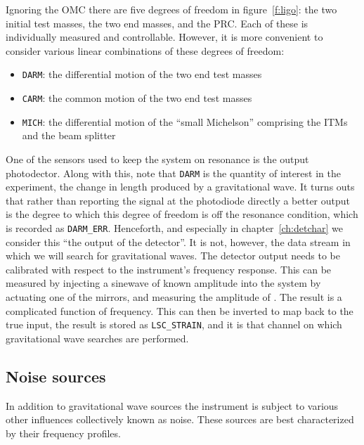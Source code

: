 Ignoring the OMC there are five degrees of freedom in
figure~\ref{f:ligo}: the two initial test masses, the two end masses,
and the PRC.  Each of these is individually measured and controllable.
However, it is more convenient to consider various linear combinations
of these degrees of freedom:

\begin{itemize}
\item \texttt{DARM}: the differential motion of the two end test masses
\item \texttt{CARM}: the common motion of the two end test masses
\item \texttt{MICH}: the differential motion of the ``small Michelson'' comprising
the ITMs and the beam splitter
\end{itemize}

One of the sensors used to keep the system on resonance is the output
photodector.  Along with this, note that \texttt{DARM} is the quantity
of interest in the experiment, the change in length produced by a
gravitational wave.    It turns outs that rather than reporting the
signal at the photodiode directly a better output is the degree to
which this degree of freedom is off the resonance condition, which is
recorded as \texttt{DARM\_ERR}.  Henceforth, and especially in
chapter~\ref{ch:detchar} we consider this ``the output of the
detector''.  It is not, however, the data stream in which we will
search for gravitational waves.  The detector output needs to be
calibrated with respect to the instrument's frequency response.  This
can be measured by injecting a sinewave of known amplitude into the
system by actuating one of the mirrors, and measuring the amplitude of
\darmerr.  The result is a complicated function of frequency.  This
can then be inverted to map \darmerr back to the true input, the
result is stored as \texttt{LSC\_STRAIN}, and it is that channel on
which gravitational wave searches are performed.

\subsection{Noise sources}

In addition to gravitational wave sources the instrument is subject to
various other influences collectively known as noise.  These sources
are best characterized by their frequency profiles.

